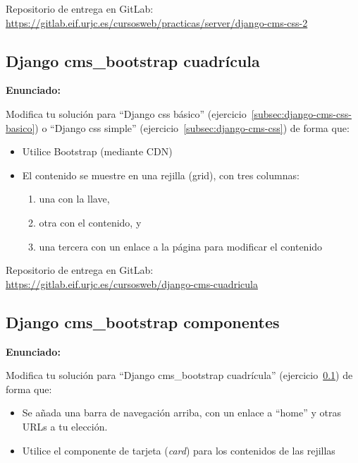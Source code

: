 Repositorio de entrega en GitLab: \\
\url{https://gitlab.eif.urjc.es/cursosweb/practicas/server/django-cms-css-2}


\subsection{Django cms\_bootstrap cuadrícula}
\label{subsec:django-cms-bootstrap-1}

\textbf{Enunciado:}

Modifica tu solución para ``Django css básico'' (ejercicio~\ref{subsec:django-cms-css-basico}) o ``Django css simple'' (ejercicio~\ref{subsec:django-cms-css}) de forma que:

\begin{itemize}
  \item Utilice Bootstrap (mediante CDN)
  \item El contenido se muestre en una rejilla (grid), con tres columnas:
  \begin{enumerate}
    \item una con la llave, 
    \item otra con el contenido, y
    \item una tercera con un enlace a la página para modificar el contenido
  \end{enumerate}
\end{itemize}


Repositorio de entrega en GitLab: \\
\url{https://gitlab.eif.urjc.es/cursosweb/django-cms-cuadricula}


\subsection{Django cms\_bootstrap componentes}
\label{subsec:django-cms-bootstrap-2}

\textbf{Enunciado:}

Modifica tu solución para ``Django cms\_bootstrap cuadrícula'' (ejercicio~\ref{subsec:django-cms-bootstrap-1}) de forma que:

\begin{itemize}
  \item Se añada una barra de navegación arriba, con un enlace a ``home'' y otras URLs a tu elección.
  \item Utilice el componente de tarjeta (\emph{card}) para los contenidos de las rejillas
\end{itemize}

